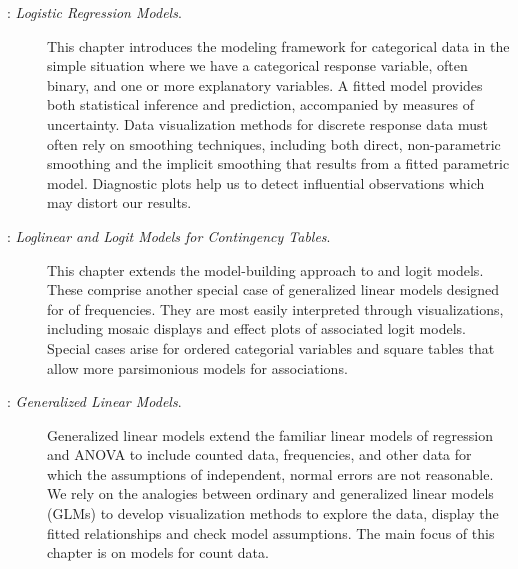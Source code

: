 \begin{description}
\item[: \emph{Logistic Regression Models}.]
This chapter introduces the modeling framework for categorical data in the simple
situation where we have a categorical response variable, often binary, and one or
more explanatory variables. A fitted model provides both statistical
inference and prediction, accompanied by measures of uncertainty.
Data visualization methods for discrete response data must often rely
on smoothing techniques, including both direct, non-parametric smoothing
and the implicit smoothing that results from a fitted parametric model.
Diagnostic plots help us to detect influential observations which may distort
our results.

\item[: \emph{Loglinear and Logit Models for Contingency Tables}.]
This chapter extends the model-building approach to \loglin and logit
models. These comprise another special case of generalized linear models
designed for \ctabs of frequencies.  They
are most easily interpreted through
visualizations, including mosaic displays and effect plots of associated
logit models.  
Special cases arise for ordered categorial variables and square tables
that allow more parsimonious models for associations.

\item[: \emph{Generalized Linear Models}.]
Generalized linear models extend the familiar linear models of
regression and ANOVA to
include counted data, frequencies, and other data for which the
assumptions of independent, normal errors are not reasonable.
We rely on the analogies between ordinary and generalized linear
models (GLMs) to develop visualization methods to explore the data,
display the fitted relationships and check model assumptions.
The main focus of this chapter is on models for count data.

\end{description}






